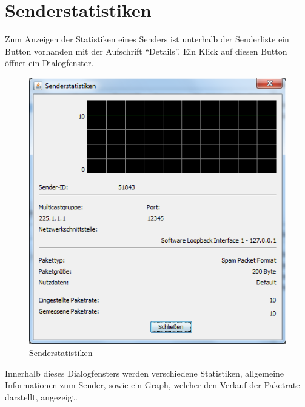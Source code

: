 \chapter{Senderstatistiken}
Zum Anzeigen der Statistiken eines Senders ist unterhalb der Senderliste ein
Button vorhanden mit der Aufschrift ``Details''. Ein Klick auf diesen Button
öffnet ein Dialogfenster.

\begin{figure}[htbp]
\begin{center}
\includegraphics{images/showSender.png}
\caption[Senderstatistiken]{Senderstatistiken}
\label{senderstatistics}
\end{center}
\end{figure}

Innerhalb dieses Dialogfensters werden verschiedene Statistiken, allgemeine
Informationen zum Sender, sowie ein Graph, welcher den Verlauf der Paketrate
darstellt, angezeigt.

